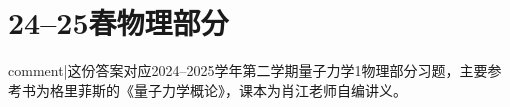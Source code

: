 \newcommand{\B}{\mathfrak{B}}
\newcommand{\RR}{\mathfrak{R}}
\newcommand{\la}{\langle}
\newcommand{\ra}{\rangle}
\newcommand{\norm}[1]{{\left\vert\kern-0.25ex\left\vert\kern-0.25ex\left\vert #1 \right\vert\kern-0.25ex\right\vert\kern-0.25ex\right\vert}}
\theoremstyle{plain}\newtheorem*{1}{习题1}
\theoremstyle{plain}\newtheorem*{2}{习题2}
\theoremstyle{plain}\newtheorem*{3}{习题3}
\theoremstyle{plain}\newtheorem*{4}{习题4}
\theoremstyle{plain}\newtheorem*{5}{习题5}
\theoremstyle{plain}\newtheorem*{6}{习题6}
\theoremstyle{plain}\newtheorem*{7}{习题7}
\theoremstyle{plain}\newtheorem*{8}{习题8}
\theoremstyle{plain}\newtheorem*{9}{习题9}
\theoremstyle{plain}\newtheorem*{10}{习题10}



\section{24--25春\quad 物理部分}
{{comment|这份答案对应2024--2025学年第二学期量子力学1物理部分习题，主要参考书为格里菲斯的《量子力学概论》，课本为肖江老师自编讲义。}}
